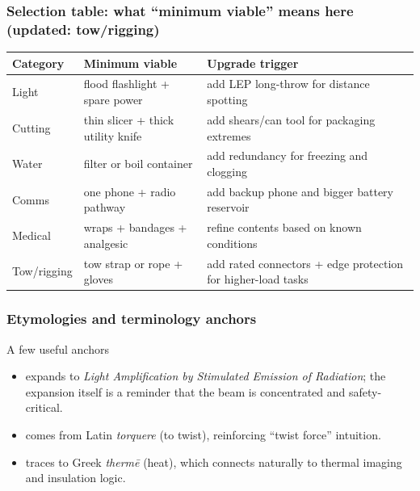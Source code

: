\begin{frame}[t,shrink=4]
  \frametitle{Selection table: what ``minimum viable'' means here (updated: tow/rigging)}
  \justifying
  \TableBodySize
  \begin{table}
    \centering
    \begin{tabularx}{\textwidth}{@{}lX X@{}}
      \toprule
      \textbf{Category} & \textbf{Minimum viable} & \textbf{Upgrade trigger} \\
      \midrule
      Light & flood flashlight + spare power & add LEP long-throw for distance spotting~\cite{plato_fl1,lep_example_thor} \\
      Cutting & thin slicer + thick utility knife & add shears/can tool for packaging extremes \\
      Water & filter or boil container & add redundancy for freezing and clogging~\cite{sawyer_mini_specs} \\
      Comms & one phone + radio pathway & add backup phone and bigger battery reservoir~\cite{fcc_gmrs} \\
      Medical & wraps + bandages + analgesic & refine contents based on known conditions~\cite{fda_acetaminophen} \\
      Tow/rigging & tow strap or rope + gloves & add rated connectors + edge protection for higher-load tasks \\
      \bottomrule
    \end{tabularx}
  \end{table}
\end{frame}


\begin{frame}[t]
  \frametitle{Etymologies and terminology anchors}
  \justifying
  \begin{block}{A few useful anchors}
    \begin{itemize}
      \item {} expands to \emph{Light Amplification by Stimulated Emission of Radiation}; the expansion itself is a reminder that the beam is concentrated and safety-critical.
      \item {} comes from Latin \emph{torquere} (to twist), reinforcing ``twist force'' intuition.
      \item {} traces to Greek \emph{therm\={e}} (heat), which connects naturally to thermal imaging and insulation logic.
    \end{itemize}
  \end{block}
\end{frame}

